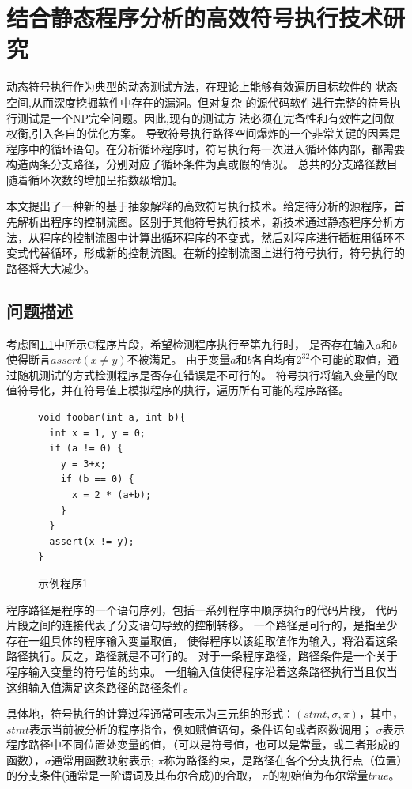 
\chapter{结合静态程序分析的高效符号执行技术研究}
\label{chap-4}
动态符号执行作为典型的动态测试方法，在理论上能够有效遍历目标软件的
状态空间,从而深度挖掘软件中存在的漏洞。但对复杂
的源代码软件进行完整的符号执行测试是一个NP完全问题。因此,现有的测试方
法必须在完备性和有效性之间做权衡,引入各自的优化方案。%
导致符号执行路径空间爆炸的一个非常关键的因素是程序中的循环语句。在分析循环程序时，符号执行每一次进入循环体内部，都需要构造两条分支路径，分别对应了循环条件为真或假的情况。
总共的分支路径数目随着循环次数的增加呈指数级增加。

本文提出了一种新的基于抽象解释的高效符号执行技术。给定待分析的源程序，首先解析出程序的控制流图。区别于其他符号执行技术，新技术通过静态程序分析方法，从程序的控制流图中计算出循环程序的不变式，然后对程序进行插桩用循环不变式代替循环，形成新的控制流图。在新的控制流图上进行符号执行，符号执行的路径将大大减少。

\section{问题描述}

考虑图\ref{fig-example1}中所示C程序片段，希望检测程序执行至第九行时，
是否存在输入$a$和$b$使得断言$assert(x \neq y)$不被满足。
由于变量$a$和$b$各自均有$2^{32}$个可能的取值，通过随机测试的方式检测程序是否存在错误是不可行的。
符号执行将输入变量的取值符号化，并在符号值上模拟程序的执行，遍历所有可能的程序路径。

\begin{figure}[h]
\begin{lstlisting}
void foobar(int a, int b){
  int x = 1, y = 0;
  if (a != 0) {
    y = 3+x;
	if (b == 0) {
	  x = 2 * (a+b);
	}
  }
  assert(x != y);
}
\end{lstlisting}
\caption{示例程序1}
\label{fig-example1}
\end{figure}

程序路径是程序的一个语句序列，包括一系列程序中顺序执行的代码片段，
代码片段之间的连接代表了分支语句导致的控制转移。
一个路径是可行的，是指至少存在一组具体的程序输入变量取值，
使得程序以该组取值作为输入，将沿着这条路径执行。反之，路径就是不可行的。
对于一条程序路径，路径条件是一个关于程序输入变量的符号值的约束。
一组输入值使得程序沿着这条路径执行当且仅当这组输入值满足这条路径的路径条件。

具体地，符号执行的计算过程通常可表示为三元组的形式：$(stmt, \sigma, \pi)$，其中，
$stmt$表示当前被分析的程序指令，例如赋值语句，条件语句或者函数调用；
$\sigma$表示程序路径中不同位置处变量的值，（可以是符号值，也可以是常量，或二者形成的函数），$\sigma$通常用函数映射表示;
$\pi$称为路径约束，是路径在各个分支执行点（位置）的分支条件(通常是一阶谓词及其布尔合成)的合取，
$\pi$的初始值为布尔常量$true$。

